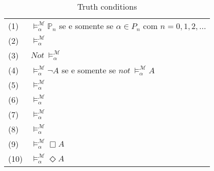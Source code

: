 \begin{center}
    \begin{table}[h!]
\label{table:truth3}
    \caption{Truth conditions}

    \begin{tabular}{ll}

        \vspace{2mm}
        (1) & $\models ^{\mathcal{M}}_{\alpha} \mathbb{P}_n$ se e somente se $\alpha \in
        P_n$ com $n=0,1,2,\ldots$\\
        \vspace{2mm}
        (2)  & $\models ^{\mathcal{M}}_{\alpha} $\\
        \vspace{2mm}
        (3)  & $Not\ \models ^{\mathcal{M}}_{\alpha} $\\
        \vspace{2mm}
        (4)  & $\models ^{\mathcal{M}}_{\alpha} \neg A$ se e somente se $not\
        \models ^{\mathcal{M}}_{\alpha} A$\\
        \vspace{2mm}
        (5)  & $\models ^{\mathcal{M}}_{\alpha} $\\
        \vspace{2mm}
        (6)  & $\models ^{\mathcal{M}}_{\alpha} $\\
        \vspace{2mm}
        (7)  & $\models ^{\mathcal{M}}_{\alpha} $\\
        \vspace{2mm}
        (8)  & $\models ^{\mathcal{M}}_{\alpha} $\\
        \vspace{2mm}
        (9)  & $\models ^{\mathcal{M}}_{\alpha} \Box A $\\
        \vspace{2mm}
        (10) & $\models ^{\mathcal{M}}_{\alpha} \Diamond A $\\

    \end{tabular}
\end{table}
\end{center}

